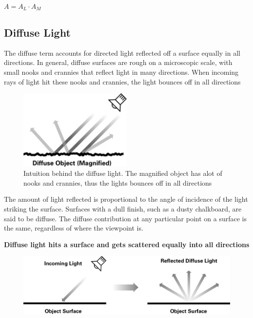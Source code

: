 \documentclass{mini}
\begin{document}
\begin{center}
    $A = A_L \cdot A_M$
\end{center}

\subsection{Diffuse Light}
The diffuse term accounts for directed light reflected off a surface equally in all directions. In general, diffuse surfaces are rough on a microscopic scale, with small nooks and crannies that reflect light in many directions. When incoming rays of light hit these nooks and crannies, the light bounces off in all directions

\begin{figure}[H]
    \centering
    \includegraphics[width=0.5\textwidth]{./images/diffuse_magnified.jpg}
    \caption{Intuition behind the diffuse light. The magnified object has alot of nooks and crannies, thus the lights bounces off in all directions}
    \label{fig:diffuse_magnified}
\end{figure}

The amount of light reflected is proportional to the angle of incidence of the light striking the surface. Surfaces with a dull finish, such as a dusty chalkboard, are said to be diffuse. The diffuse contribution at any particular point on a surface is the same, regardless of where the viewpoint is.

{\bf Diffuse light hits a surface and gets scattered equally into all directions}

\begin{figure}[H]
    \centering
    \includegraphics[width=1.0\textwidth]{./images/diffuse.jpg}
    \caption{}
    \label{fig:diffuse}
\end{figure}
\end{document}
